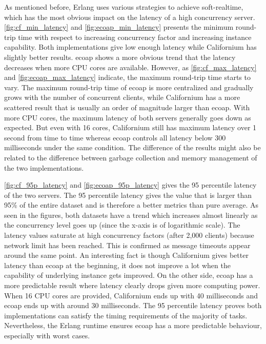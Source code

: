 As mentioned before, Erlang uses various strategies to achieve soft-realtime, which has the most obvious impact on the latency of a high concurrency server. \autoref{fig:cf_min_latency} and \autoref{fig:ecoap_min_latency} presents the minimum round-trip time with respect to increasing concurrency factor and increasing instance capability. Both implementations give low enough latency while Californium has slightly better results. ecoap shows a more obvious trend that the latency decreases when more CPU cores are available. However, as \autoref{fig:cf_max_latency} and \autoref{fig:ecoap_max_latency} indicate, the maximum round-trip time starts to vary. The maximum round-trip time of ecoap is more centralized and gradually grows with the number of concurrent clients, while Californium has a more scattered result that is usually an order of magnitude larger than ecoap. With more CPU cores, the maximum latency of both servers generally goes down as expected. But even with 16 cores, Californium still has maximum latency over 1 second from time to time whereas ecoap controls all latency below 300 milliseconds under the same condition. The difference of the results might also be related to the difference between garbage collection and memory management of the two implementations.

\autoref{fig:cf_95p_latency} and \autoref{fig:ecoap_95p_latency} gives the 95 percentile latency of the two servers. The 95 percentile latency gives the value that is larger than 95\% of the entire dataset and is therefore a better metrics than pure average. As seen in the figures, both datasets have a trend which increases almost linearly as the concurrency level goes up (since the x-axis is of logarithmic scale). The latency values saturate at high concurrency factors (after 2,000 clients) because network limit has been reached. This is confirmed as message timeouts appear around the same point. An interesting fact is though Californium gives better latency than ecoap at the beginning, it does not improve a lot when the capability of underlying instance gets improved. On the other side, ecoap has a more predictable result where latency clearly drops given more computing power. When 16 CPU cores are provided, Californium ends up with 40 milliseconds and ecoap ends up with around 30 milliseconds. The 95 percentile latency proves both implementations can satisfy the timing requirements of the majority of tasks. Nevertheless, the Erlang runtime ensures ecoap has a more predictable behaviour, especially with worst cases.

